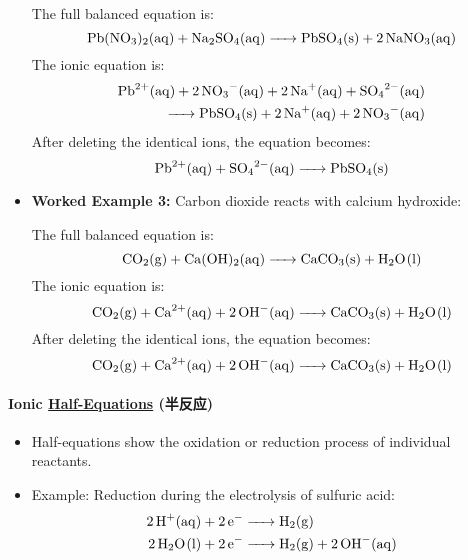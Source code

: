 \begin{itemize}
    The full balanced equation is:
    \begin{equation}
        \ce{Pb(NO3)2(aq) + Na2SO4(aq) -> PbSO4(s) + 2NaNO3(aq)}
    \end{equation}
    The ionic equation is:
    \begin{equation}
        \begin{split}
            \ce{Pb^{2+}(aq) + 2NO3-(aq) + 2Na+(aq) + SO4^{2-}(aq) \\ -> PbSO4(s) + 2Na+(aq) + 2NO3-(aq)}
        \end{split}
    \end{equation}
    After deleting the identical ions, the equation becomes:
    \begin{equation}
        \ce{Pb^{2+}(aq) + SO4^{2-}(aq) -> PbSO4(s)}
    \end{equation}
    \item \textbf{Worked Example 3:} Carbon dioxide reacts with calcium hydroxide:\par
    The full balanced equation is:
    \begin{equation}
        \ce{CO2(g) + Ca(OH)2(aq) -> CaCO3(s) + H2O(l)}
    \end{equation}
    The ionic equation is:
    \begin{equation}
        \ce{CO2(g) + Ca^{2+}(aq) + 2OH-(aq) -> CaCO3(s) + H2O(l)}
    \end{equation}
    After deleting the identical ions, the equation becomes:
    \begin{equation}
        \ce{CO2(g) + Ca^{2+}(aq) + 2OH-(aq) -> CaCO3(s) + H2O(l)}
    \end{equation}
\end{itemize}

\paragraph{Ionic \underline{Half-Equations} (半反应)}
\begin{itemize}
    \item Half-equations show the oxidation or reduction process of individual reactants.
    \item Example: Reduction during the electrolysis of sulfuric acid:
    \begin{equation}
        \begin{split}
            \ce{2H+(aq) + 2e- &-> H2(g)} \\
            \ce{2H2O(l) + 2e- &-> H2(g) + 2OH-(aq)}
        \end{split}
    \end{equation}
\end{itemize}
